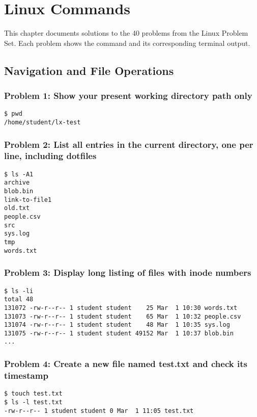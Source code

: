 \chapter{Linux Commands}
\label{ch:linux}

This chapter documents solutions to the 40 problems from the Linux Problem Set.  
Each problem shows the command and its corresponding terminal output.

\section{Navigation and File Operations}

\subsection*{Problem 1: Show your present working directory path only}
\begin{verbatim}
$ pwd
/home/student/lx-test
\end{verbatim}

\subsection*{Problem 2: List all entries in the current directory, one per line, including dotfiles}
\begin{verbatim}
$ ls -A1
archive
blob.bin
link-to-file1
old.txt
people.csv
src
sys.log
tmp
words.txt
\end{verbatim}

\subsection*{Problem 3: Display long listing of files with inode numbers}
\begin{verbatim}
$ ls -li
total 48
131072 -rw-r--r-- 1 student student    25 Mar  1 10:30 words.txt
131073 -rw-r--r-- 1 student student    65 Mar  1 10:32 people.csv
131074 -rw-r--r-- 1 student student    48 Mar  1 10:35 sys.log
131075 -rw-r--r-- 1 student student 49152 Mar  1 10:37 blob.bin
...
\end{verbatim}

\subsection*{Problem 4: Create a new file named test.txt and check its timestamp}
\begin{verbatim}
$ touch test.txt
$ ls -l test.txt
-rw-r--r-- 1 student student 0 Mar  1 11:05 test.txt
\end{verbatim}

